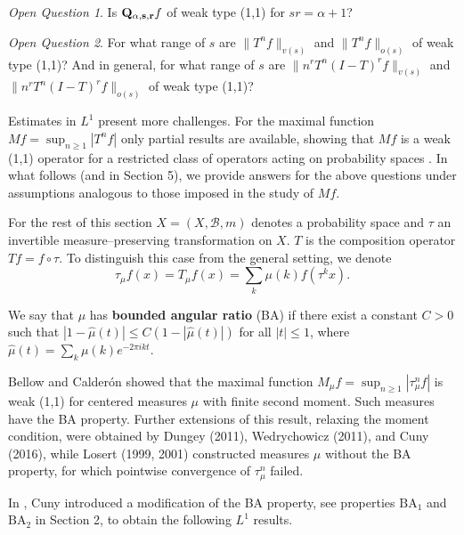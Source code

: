 \documentclass[11pt]{amsart}
\theoremstyle{definition}
\newtheorem{defn}[thm]{Definition} %
\theoremstyle{remark}
\newtheorem{open}{Open Question}
\begin{document}
\begin{open} Is ${\bf Q_{\alpha,s,r}}f$ of weak type (1,1)  for $sr=\alpha+1$? 
\end{open}
\begin{open} For what range of $s$ are
  $\lVert  T^nf\rVert_{v(s)}$ and $\lVert  T^n f\rVert_{o(s)}$ of weak type (1,1)? And in general, for what range of $s$ are
  $\lVert  n^r T^n(I-T)^rf\rVert_{v(s)}$ and $\lVert n^r  T^n(I-T)^r f\rVert_{o(s)}$ of weak type (1,1)?
  
\end{open}


Estimates in $L^1$ present more challenges. For the maximal function $Mf=\sup_{n\ge 1} |T^nf|$ only partial results  are available, showing that $Mf$ is a weak (1,1) operator for a restricted class of operators acting on probability spaces 
\cite{BC,karin,Cuny-weak}. 
In what follows (and in Section 5), we provide answers for the above questions under assumptions analogous to those imposed in the study of $Mf$.

For the rest of this section $X=(X,\mathcal B,m)$ denotes a probability space and $\tau$ an invertible measure--preserving transformation on $X$. $T$ is the composition operator $Tf=f\circ \tau$.
To distinguish this case from the general setting, we denote
\begin{equation}
\tau_{\mu}f(x)= T_{\mu}f(x)=\sum_k \mu(k) f(\tau^k x).
\label{eq:1}
\end{equation}


We say that $\mu$ has {\bf bounded angular ratio} (BA) if there exist a constant $C>0$ such that
$|1-\hat\mu(t)|\le C (1-|\hat\mu(t)|)$ for all $|t|\le 1$, where $\hat{\mu}(t)=\sum_k \mu(k) e^{-2\pi i kt}$.

 Bellow and Calder\'on   \cite{BC}  showed that the maximal function $M_{\mu}f=
 \sup_{n\ge 1} |\tau^n_{\mu}f|$ is weak (1,1) 
 for centered measures $\mu$ with finite second moment. Such measures have the BA property.
 Further extensions of this result, relaxing the moment condition, were obtained by Dungey \cite{Dunn} (2011), Wedrychowicz  \cite{Chris} (2011), and Cuny \cite{Cuny-weak} (2016), 
 while Losert \cite{Losert1,Losert2} (1999, 2001) constructed measures $\mu$ without the BA property, for which pointwise convergence of $\tau^n_{\mu}$ failed.  

In \cite{Cuny-weak}, Cuny introduced a modification of the BA property, see properties $\text{BA}_1$ and $\text{BA}_2$ in Section 2, to obtain the following $L^1$ results.
\end{document}
